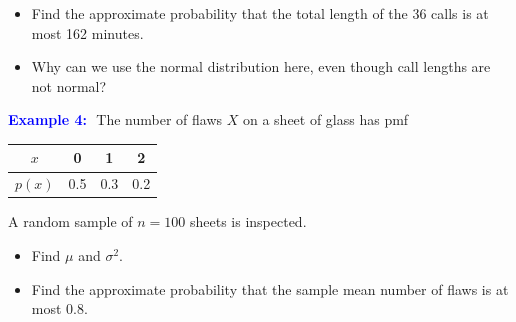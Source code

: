 \documentclass[12pt]{beamer}
\newcommand{\fitO}{}
\newcommand{\exlists}{\setlength{\itemsep}{0pt}}
\begin{document}
\begin{frame}[t]{}\fitO\exlists
\begin{itemize}
\item[b)] Find the approximate probability that the total length of the 36 calls is at most 162 minutes.\\[3.4cm]
\item[c)] Why can we use the normal distribution here, even though call lengths are not normal?\\[0.2cm]
\end{itemize}
\end{frame}

\begin{frame}[t]{}\fitO\exlists
\textcolor{blue}{\textbf{Example 4:}}\,\ The number of flaws $X$ on a sheet of glass has pmf
\begin{center}
\renewcommand{\arraystretch}{1.3}
\begin{tabular}{c|ccc}
$x$    & 0   & 1   & 2   \\ \hline
$p(x)$ & 0.5 & 0.3 & 0.2 \\
\end{tabular}
\end{center}
A random sample of $n=100$ sheets is inspected.
\begin{itemize}
\item[a)] Find $\mu$ and $\sigma^2$.\\[0.2cm]
\end{itemize}
\end{frame}

\begin{frame}[t]{}\fitO\exlists
\begin{itemize}
\item[b)] Find the approximate probability that the sample mean number of flaws is at most 0.8.\\[0.2cm]
\end{itemize}
\end{frame}
\end{document}

